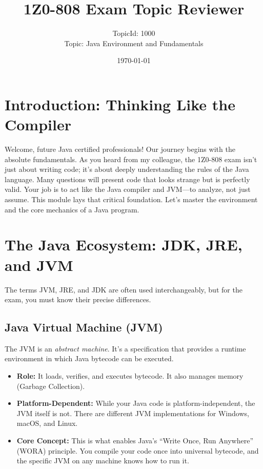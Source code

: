 \documentclass[12pt]{article}
\title{\textbf{1Z0-808 Exam Topic Reviewer}}
\author{TopicId: 1000 \\ Topic: Java Environment and Fundamentals}
\date{\today}
\begin{document}
\maketitle
\newpage\begin{enumerate}[label=(\arabic*)]
\section*{Introduction: Thinking Like the Compiler}
Welcome, future Java certified professionals! Our journey begins with the absolute fundamentals. As you heard from my colleague, the 1Z0-808 exam isn't just about writing code; it's about deeply understanding the rules of the Java language. Many questions will present code that looks strange but is perfectly valid. Your job is to act like the Java compiler and JVM---to analyze, not just assume. This module lays that critical foundation. Let's master the environment and the core mechanics of a Java program.

\section{The Java Ecosystem: JDK, JRE, and JVM}
The terms JVM, JRE, and JDK are often used interchangeably, but for the exam, you must know their precise differences.

\subsection{Java Virtual Machine (JVM)}
The JVM is an \textit{abstract machine}. It's a specification that provides a runtime environment in which Java bytecode can be executed.
\begin{itemize}
    \item \textbf{Role:} It loads, verifies, and executes bytecode. It also manages memory (Garbage Collection).
    \item \textbf{Platform-Dependent:} While your Java code is platform-independent, the JVM itself is not. There are different JVM implementations for Windows, macOS, and Linux.
    \item \textbf{Core Concept:} This is what enables Java's ``Write Once, Run Anywhere'' (WORA) principle. You compile your code once into universal bytecode, and the specific JVM on any machine knows how to run it.
\end{itemize}


\end{enumerate}
\end{document}
